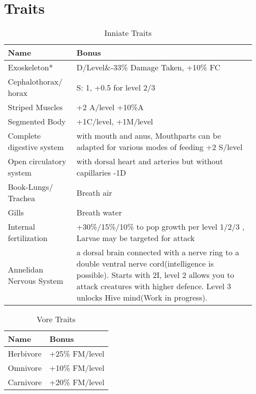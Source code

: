 \chapter{Traits}
\label{ch:chapter03}
\renewcommand{\tabularxcolumn}[1]{>{\raggedright\arraybackslash\setlength{\parskip}{.5em}}p{#1}}

\begin{table}[h]
		\begin{tabularx}{\linewidth}{|l|X|}
		\hline
		Name & Bonus\\
		\hline
		Exoskeleton* & \ac{D}/Level\&-33\% Damage Taken, +10\% \ac{FC}\\
		\hline	
		Cephalothorax/ horax & \ac{S}: 1, +0.5 for level 2/3\\
		\hline
		Striped Muscles & +2 \ac{A}/level +10\%\ac{A}\\
		\hline
		Segmented Body & +1\ac{C}/level, +1\ac{M}/level\\
		\hline
		Complete digestive system & with mouth and anus, Mouthparts can be adapted for various modes of feeding +2 \ac{S}/level\\
		\hline
		Open circulatory system & with dorsal heart and arteries but without capillaries -1\ac{D}\\
		\hline
		Book-Lungs/ Trachea & Breath air\\
		\hline
		Gills & Breath water\\
		\hline
		Internal fertilization & +30\%/15\%/10\% to pop growth per level 1/2/3 , Larvae may be targeted for attack\\
		\hline
		Annelidan Nervous System & a dorsal brain connected with a nerve ring to a double ventral nerve cord(intelligence is possible). Starts with 2\ac{I}, level 2 allows you to attack creatures with higher defence. Level 3 unlocks Hive mind(Work in progress).\\
		\hline
		\end{tabularx}
	\caption{Inniate Traits}
	\label{tab:InniateTraits}
\end{table}

\begin{table}[h]
		\begin{tabularx}{\linewidth}{|l|X|}
		\hline
		Name & Bonus\\
		\hline
		Herbivore & +25\% \ac{FM}/level\\
		\hline
		Omnivore & +10\% \ac{FM}/level\\
		\hline
		Carnivore & +20\% \ac{FM}/level\\
		\hline
		\end{tabularx}
	\caption{Vore Traits}
	\label{tab:VoreTraits}
\end{table}

